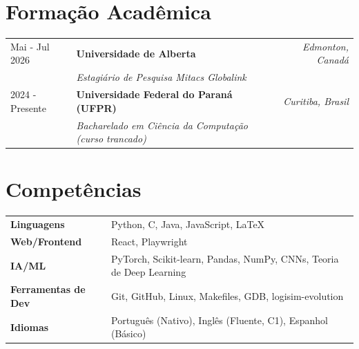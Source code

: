 \documentclass[a4paper,12pt]{article}
\begin{document}
\section{Formação Acadêmica}

\begin{tabularx}{\linewidth}{@{}l X r@{}}
Mai - Jul 2026 & \textbf{Universidade de Alberta} & \textit{Edmonton, Canadá} \\
& \textit{Estagiário de Pesquisa Mitacs Globalink} & \\[4pt]
2024 - Presente & \textbf{Universidade Federal do Paraná (UFPR)} & \textit{Curitiba, Brasil} \\
& \textit{Bacharelado em Ciência da Computação (curso trancado)} & \\
\end{tabularx}

\section{Competências}

\begin{tabularx}{\linewidth}{@{}l X@{}}
\textbf{Linguagens} & Python, C, Java, JavaScript, LaTeX \\
\textbf{Web/Frontend} & React, Playwright \\
\textbf{IA/ML} & PyTorch, Scikit-learn, Pandas, NumPy, CNNs, Teoria de Deep Learning \\
\textbf{Ferramentas de Dev} & Git, GitHub, Linux, Makefiles, GDB, logisim-evolution \\
\textbf{Idiomas} & Português (Nativo), Inglês (Fluente, C1), Espanhol (Básico)\\
\end{tabularx}

\vfill
{}
\end{document}
